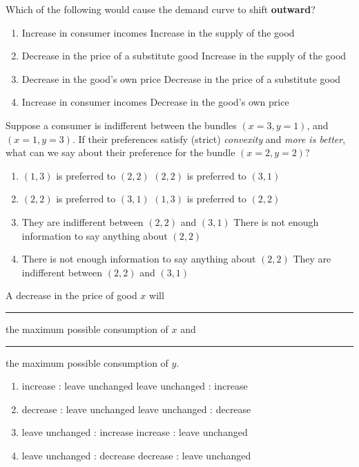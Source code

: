 \begin{question}[type=exam]{4}
  Which of the following would cause the demand curve to shift \textbf{outward}?
  \begin{enumerate}[label=\alph*), noitemsep]
    \item \vary
      {Increase in consumer incomes} %
      {Increase in the supply of the good}
    \item \vary
      {Decrease in the price of a substitute good}
      {Increase in the supply of the good}
    \item \vary
      {Decrease in the good's own price}
      {Decrease in the price of a substitute good}
    \item \vary
      {Increase in consumer incomes} %
      {Decrease in the good's own price}
  \end{enumerate}
\end{question}

\begin{question}[type=exam]{4}
  Suppose a consumer is indifferent between the bundles $(x=3,y=1)$, and $(x=1,y=3)$.
  If their preferences satisfy (strict) \textit{convexity} and \textit{more is better}, 
  what can we say about their preference for the bundle $(x=2,y=2)$?
  \begin{enumerate}[label=\alph*), noitemsep]
    \item \vary
      {$(1,3)$ is preferred to $(2,2)$}
      {$(2,2)$ is preferred to $(3,1)$} %
    \item \vary
      {$(2,2)$ is preferred to $(3,1)$} %
      {$(1,3)$ is preferred to $(2,2)$}
    \item \vary
      {They are indifferent between $(2,2)$ and $(3,1)$}
      {There is not enough information to say anything about $(2,2)$}
    \item \vary
      {There is not enough information to say anything about $(2,2)$}
      {They are indifferent between $(2,2)$ and $(3,1)$}
  \end{enumerate}
\end{question}

\begin{question}[type=exam]{4}
  A decrease in the price of good $x$ will \rule{1cm}{0.15mm} the maximum possible consumption of $x$
  and \rule{1cm}{0.15mm} the maximum possible consumption of $y$.
  \begin{enumerate}[label=\alph*), noitemsep]
    \item \vary
      {increase : leave unchanged} %
      {leave unchanged : increase}
    \item \vary
      {decrease : leave unchanged}
      {leave unchanged : decrease}
    \item \vary
      {leave unchanged : increase}
      {increase : leave unchanged} %
    \item \vary
      {leave unchanged : decrease}
      {decrease : leave unchanged}
  \end{enumerate}
\end{question}

